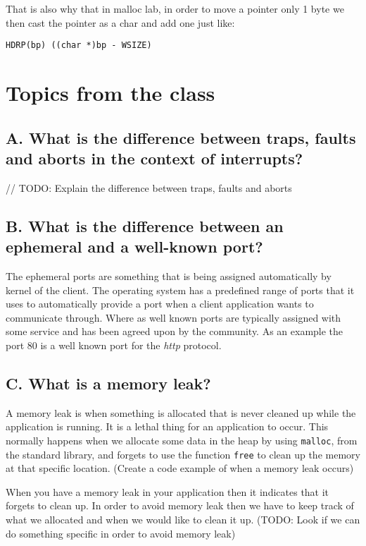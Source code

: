 \documentclass[11pt]{article}
\newcommand{\code}[1]{{\colorbox{lightgray!15}{\color{orange}\texttt{#1}}}}
\newcommand{\temp}[1]{{\color{red}#1}}
\begin{document}
That is also why that in malloc lab, in order to move a pointer only 1 byte we then cast the pointer as a char and add one just like: 

\code{HDRP(bp) ((char *)bp - WSIZE)}

\section{Topics from the class}

\subsection{A. What is the difference between traps, faults and aborts in the context of interrupts?}

// TODO: Explain the difference between traps, faults and aborts

\subsection{B. What is the difference between an ephemeral and a well-known port?}
The ephemeral ports are something that is being assigned automatically by kernel of the client. The operating system has a predefined range of ports that it uses to automatically provide a port when a client application wants to communicate through. 
Where as well known ports are typically assigned with some service and has been 
agreed upon by the community. As an example the port 80 is a well known port for the \textit{http} protocol.

\subsection{C. What is a memory leak?}
A memory leak is when something is allocated that is never cleaned up while the application is running. 
It is a lethal thing for an application to occur. This normally happens when we allocate some data in the heap
by using \code{malloc}, from the standard library, and forgets to use the function \code{free} to clean up the memory
at that specific location. \temp{(Create a code example of when a memory leak occurs)}

When you have a memory leak in your application then it indicates that it forgets to clean up.
In order to avoid memory leak then we have to keep track of what we allocated and when we would like to clean it up.
\temp{(TODO: Look if we can do something specific in order to avoid memory leak)}
\end{document}
